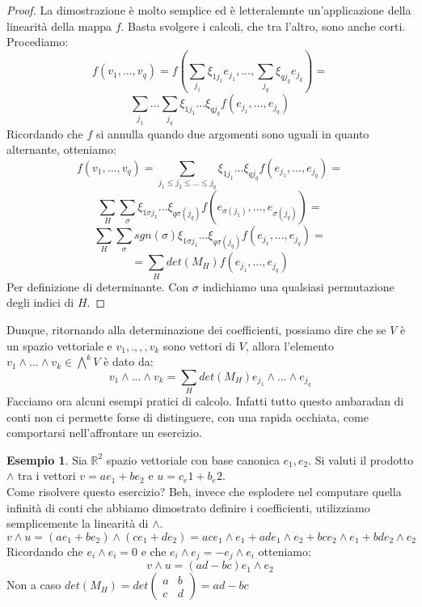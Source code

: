 \documentclass[12pt,a4paper]{report}
\theoremstyle{definition}
\theoremstyle{Theorem}
\theoremstyle{definition}
\newtheorem{Ex}[Def]{Esempio}
\theoremstyle{definition}
\theoremstyle{definition}
\begin{document}
	\begin{proof}
		La dimostrazione è molto semplice ed è letteralemnte un'applicazione della linearità della mappa $f$. Basta svolgere i calcoli, che tra l'altro, sono anche corti. Procediamo:
		$$f(v_1,...,v_q)=f(\sum_{j_1}\xi_{1j_1}e_{j_1},...,\sum_{j_q}\xi_{qj_q}e_{j_q})=$$
		$$\sum_{j_1}...\sum_{j_q}\xi_{1j_1}...\xi_{qj_q}f(e_{j_1},...,e_{j_q})$$
		Ricordando che $f$ si annulla quando due argomenti sono uguali in quanto alternante, otteniamo:
		$$f(v_1,...,v_q)=\sum_{j_1\le j_2\le...\le j_q}\xi_{1j_1}...\xi_{qj_q}f(e_{j_1},...,e_{j_q})=$$
		$$\sum_{H}\sum_{\sigma}\xi_{1\sigma{j_1}}...\xi_{q\sigma(j_q)}f(e_{\sigma(j_1)},...,e_{\sigma(j_q)})=$$
		$$\sum_{H}\sum_{\sigma}sgn(\sigma)\xi_{1\sigma{j_1}}...\xi_{q\sigma(j_q)}f(e_{j_1},...,e_{j_q})=$$
		$$
		=\sum_{H}det(M_H)f(e_{j_1},...,e_{j_q})$$
		Per definizione di determinante. Con $\sigma$ indichiamo una qualsiasi permutazione degli indici di $H$.
	\end{proof}
	Dunque, ritornando alla determinazione dei coefficienti, possiamo dire che se $V$ è un spazio vettoriale e $v_1,.,,,v_k$ sono vettori di $V$, allora l'elemento $v_1\wedge...\wedge v_k\in \bigwedge^kV$ è dato da:
	$$v_1\wedge...\wedge v_k=\sum_{H}det(M_H)e_{j_1}\wedge...\wedge e_{j_q}$$
	Facciamo ora alcuni esempi pratici di calcolo. Infatti tutto questo ambaradan di conti non ci permette forse di distinguere, con una rapida occhiata, come comportarsi nell'affrontare un esercizio.
	\begin{Ex}
		Sia $\mathbb{R}^2$ spazio vettoriale con base canonica $e_1,e_2$. Si valuti il prodotto $\wedge$ tra i vettori $v=ae_1+be_2$ e $u=c_e1+b_e2$.\\
		Come risolvere questo esercizio? Beh, invece che esplodere nel computare quella infinità di conti che abbiamo dimostrato definire i coefficienti, utilizziamo semplicemente la linearità di $\wedge$.
		$$v\wedge u=(ae_1+be_2)\wedge(ce_1+de_2)=ace_1\wedge e_1+ade_1\wedge e_2+bce_2\wedge e_1+bde_2\wedge e_2$$ 
		Ricordando che $e_i\wedge e_i=0$ e che $e_i\wedge e_j=-e_j\wedge e_i$ otteniamo:
		$$v\wedge u=(ad-bc)e_1\wedge e_2$$
		Non a caso $det(M_H)=det\begin{pmatrix}
			a&b\\c&d
		\end{pmatrix}=ad-bc$
	\end{Ex}
\end{document}
